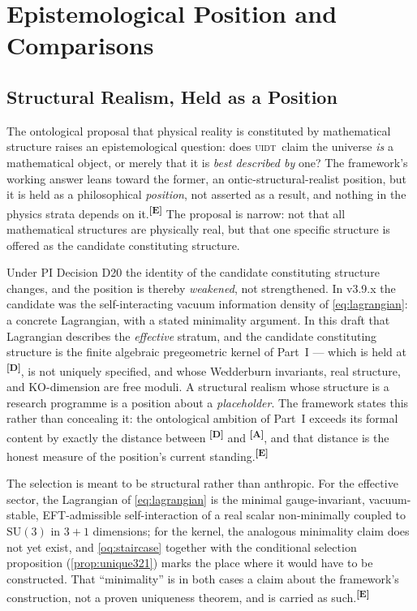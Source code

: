 \documentclass[12pt,a4paper,twoside]{article}
\theoremstyle{plain}
\theoremstyle{definition}
\theoremstyle{remark}
\newcommand{\UIDT}{\textsc{uidt}}
\newcommand{\catmark}[1]{\textsuperscript{\textsf{\textbf{[#1]}}}}
\begin{document}
\section{Epistemological Position and Comparisons}
\label{sec:epistemology}

\subsection{Structural Realism, Held as a Position}
\label{subsec:structural-realism}

The ontological proposal that physical reality is constituted by
mathematical structure raises an epistemological question: does \UIDT\
claim the universe \emph{is} a mathematical object, or merely that it is
\emph{best described by} one? The framework's working answer leans toward
the former, an ontic-structural-realist position, but it is held as a
philosophical \emph{position}, not asserted as a result, and nothing in
the physics strata depends on it.\catmark{E} The proposal is narrow: not
that all mathematical structures are physically real, but that one
specific structure is offered as the candidate constituting structure.

\begin{governancebox}[What D20 Does to the Structural-Realist Position]
Under PI Decision D20 the identity of the candidate constituting
structure changes, and the position is thereby \emph{weakened}, not
strengthened. In v3.9.x the candidate was the self-interacting vacuum
information density of \cref{eq:lagrangian}: a concrete Lagrangian, with
a stated minimality argument. In this draft that Lagrangian describes the
\emph{effective} stratum, and the candidate constituting structure is the
finite algebraic pregeometric kernel of Part~I --- which is held at
\catmark{D}, is not uniquely specified, and whose Wedderburn invariants,
real structure, and KO-dimension are free moduli. A structural realism
whose structure is a research programme is a position about a
\emph{placeholder}. The framework states this rather than concealing it:
the ontological ambition of Part~I exceeds its formal content by exactly
the distance between \catmark{D} and \catmark{A}, and that distance is
the honest measure of the position's current standing.\catmark{E}
\end{governancebox}

\noindent The selection is meant to be structural rather than anthropic.
For the effective sector, the Lagrangian of \cref{eq:lagrangian} is the
minimal gauge-invariant, vacuum-stable, EFT-admissible self-interaction
of a real scalar non-minimally coupled to $\mathrm{SU}(3)$ in $3+1$
dimensions; for the kernel, the analogous minimality claim does not yet
exist, and \cref{oq:staircase} together with the conditional selection
proposition (\cref{prop:unique321}) marks the place where it would have
to be constructed. That ``minimality'' is in both cases a claim about the
framework's construction, not a proven uniqueness theorem, and is carried
as such.\catmark{E}
\end{document}
